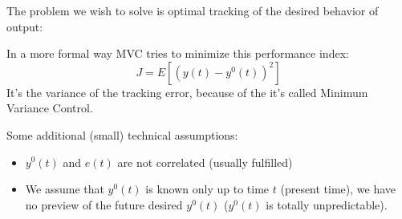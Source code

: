 The problem we wish to solve is optimal tracking of the desired behavior of output:
\begin{figure}[H]
    \centering
\end{figure}

In a more formal way MVC tries to minimize this performance index:
\[
    J = E\left[ (y(t) - y^0(t))^2 \right]
\]
It's the variance of the tracking error, because of the it's called Minimum Variance Control.

Some additional (small) technical assumptions:
\begin{itemize}
    \item $y^0(t)$ and $e(t)$ are not correlated (usually fulfilled)
    \item We assume that $y^0(t)$ is known only up to time $t$ (present time), we have no preview of the future desired $y^0(t)$ ($y^0(t)$ is totally unpredictable).
\end{itemize}


